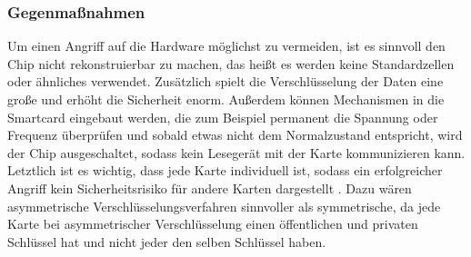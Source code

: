 \subsubsection{Gegenmaßnahmen}
Um einen Angriff auf die Hardware möglichst zu vermeiden, ist es sinnvoll den Chip nicht rekonstruierbar zu machen,
das heißt es werden keine Standardzellen oder ähnliches verwendet. Zusätzlich spielt die Verschlüsselung 
der Daten eine große und erhöht die Sicherheit enorm. Außerdem können Mechanismen in die Smartcard 
eingebaut werden, die zum Beispiel permanent die Spannung oder Frequenz überprüfen und sobald etwas
nicht dem Normalzustand entspricht, wird der Chip ausgeschaltet, sodass kein Lesegerät mit der 
Karte kommunizieren kann. Letztlich ist es wichtig, dass jede Karte individuell ist, sodass ein 
erfolgreicher Angriff kein Sicherheitsrisiko für andere Karten dargestellt \cite{refmas:ASSS}. 
Dazu wären asymmetrische Verschlüsselungsverfahren sinnvoller als symmetrische, da jede Karte bei
asymmetrischer Verschlüsselung einen öffentlichen und privaten Schlüssel hat und nicht jeder den
selben Schlüssel haben.




